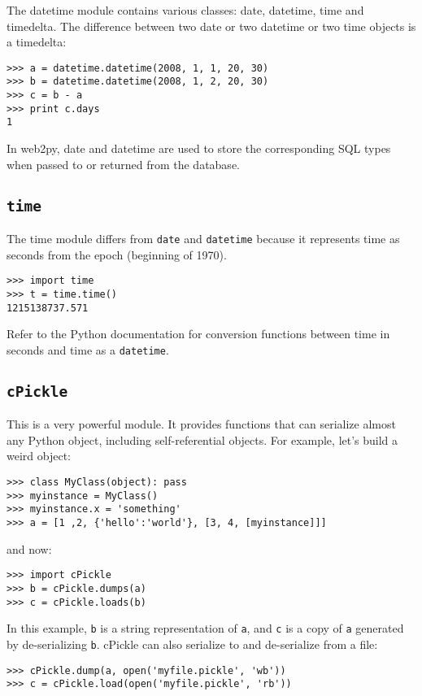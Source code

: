\documentclass[justified,sixbynine,notoc]{tufte-book}
\def\ft{\small\tt}
\def\inxx#1{\index{#1}}
\begin{document}
\begin{fullwidth}
The datetime module contains various classes: date, datetime, time and timedelta. The difference between two date or two datetime or two time objects is a timedelta:
\begin{lstlisting}
>>> a = datetime.datetime(2008, 1, 1, 20, 30)
>>> b = datetime.datetime(2008, 1, 2, 20, 30)
>>> c = b - a
>>> print c.days
1
\end{lstlisting}

In web2py, date and datetime are used to store the corresponding SQL types when passed to or returned from the database.

\goodbreak\subsection{{\ft time}}

\inxx{time}

The time module differs from {\ft date} and {\ft datetime} because it represents time as seconds from the epoch (beginning of 1970).
\begin{lstlisting}
>>> import time
>>> t = time.time()
1215138737.571
\end{lstlisting}

Refer to the Python documentation for conversion functions between time in seconds and time as a {\ft datetime}.

\goodbreak\subsection{{\ft cPickle}}

\inxx{cPickle}

This is a very powerful module. It provides functions that can serialize almost any Python object, including self-referential objects. For example, let's build a weird object:
\begin{lstlisting}
>>> class MyClass(object): pass
>>> myinstance = MyClass()
>>> myinstance.x = 'something'
>>> a = [1 ,2, {'hello':'world'}, [3, 4, [myinstance]]]
\end{lstlisting}
\noindent and now:
\begin{lstlisting}
>>> import cPickle
>>> b = cPickle.dumps(a)
>>> c = cPickle.loads(b)
\end{lstlisting}

In this example, {\ft b} is a string representation of {\ft a}, and {\ft c} is a copy of {\ft a} generated by de-serializing {\ft b}.
\noindent cPickle can also serialize to and de-serialize from a file:
\begin{lstlisting}
>>> cPickle.dump(a, open('myfile.pickle', 'wb'))
>>> c = cPickle.load(open('myfile.pickle', 'rb'))
\end{lstlisting}


\end{fullwidth}
\end{document}
